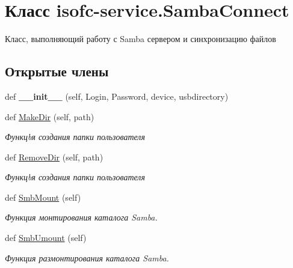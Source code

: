\hypertarget{classisofc-service_1_1SambaConnect}{}\section{Класс isofc-\/service.Samba\+Connect}
\label{classisofc-service_1_1SambaConnect}


Класс, выполняющий работу с Samba сервером и синхронизацию файлов  


\subsection*{Открытые члены}
\begin{DoxyCompactItemize}
\item 
\mbox{\label{classisofc-service_1_1SambaConnect_a1f6c9a61dea2855ea0b683beeade8982}} 
def {\bfseries \+\_\+\+\_\+init\+\_\+\+\_\+} (self, Login, Password, device, usbdirectory)
\item 
def \mbox{\hyperlink{classisofc-service_1_1SambaConnect_ae1f125cc648b11006ae4cd15f32d5d7d}{Make\+Dir}} (self, path)
\begin{DoxyCompactList}\small\item\em Функцbя создания папки пользователя \end{DoxyCompactList}\item 
def \mbox{\hyperlink{classisofc-service_1_1SambaConnect_a53b1038919225c543e2f432b3e53fb5b}{Remove\+Dir}} (self, path)
\begin{DoxyCompactList}\small\item\em Функцbя создания папки пользователя \end{DoxyCompactList}\item 
def \mbox{\hyperlink{classisofc-service_1_1SambaConnect_a95a21d63db6f88fd43eb6a8958bb174d}{Smb\+Mount}} (self)
\begin{DoxyCompactList}\small\item\em Функция монтирования каталога Samba. \end{DoxyCompactList}\item 
def \mbox{\hyperlink{classisofc-service_1_1SambaConnect_a3979f8cc410218f1a71d44f340d1cdf8}{Smb\+Umount}} (self)
\begin{DoxyCompactList}\small\item\em Функция размонтирования каталога Samba. \end{DoxyCompactList}\item 

\end{DoxyCompactItemize}
